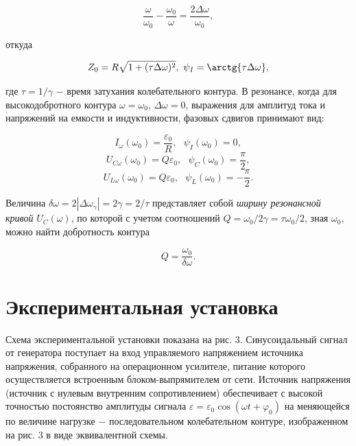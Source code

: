 \documentclass[a4paper,12pt]{article} %
\begin{document}
$$
\frac{\omega}{\omega_{0}} - \frac{\omega_{0}}{\omega} = \frac{2\Delta\omega}{\omega_{0}},
$$

\hfill \break откуда

$$
Z_{0} = R\sqrt{1+(\tau\Delta\omega)^2}, \text{ } \psi_{I} = \arctg{\tau\Delta\omega},
$$

\hfill \break где $\tau = 1/\gamma$ $-$ время затухания колебательного контура. В резонансе, когда для высокодобротного контура $\omega = \omega_{0}$, $\Delta \omega = 0$, выражения для амплитуд тока и напряжений на емкости и индуктивности, фазовых сдвигов принимают вид:

\begin{equation}\label{ linkname }
I_{\omega}(\omega_{0}) = \frac{\varepsilon_{0}}{R}, \text{ } \psi_{I} (\omega_{0}) = 0,
\end{equation}
\begin{equation}\label{ linkname }
U_{C\omega} (\omega_{0}) = Q\varepsilon_{0}, \text{ } \psi_{C} (\omega_{0}) = \frac{\pi}{2},
\end{equation}
\begin{equation}\label{ linkname }
U_{L\omega} (\omega_{0}) = Q\varepsilon_{0}, \text{ } \psi_{L} (\omega_{0})  = -\frac{\pi}{2}.
\end{equation}

\hfill \break Величина $\delta \omega = 2|\Delta \omega_{\gamma}| = 2\gamma = 2/\tau$ представляет собой \textit{ширину резонансной кривой} $U_{C} (\omega)$, по которой с учетом соотношений $Q = \omega_{0}/2\gamma = \tau\omega_{0}/2$, зная $\omega_{0}$, можно найти добротность контура

\begin{equation}\label{ linkname }
Q = \frac{\omega_{0}}{\delta\omega}.
\end{equation}

\section{Экспериментальная установка}

\hfill \break Схема экспериментальной установки показана на рис. 3. Синусоидальный сигнал от генератора поступает на вход управляемого напряжением источника напряжения, собранного на операционном усилителе, питание которого осуществляется встроенным блоком-выпрямителем от сети. Источник напряжения (источник с нулевым внутренним сопротивлением) обеспечивает с высокой точностью постоянство амплитуды сигнала $\varepsilon = \varepsilon_{0}\cos{(\omega t + \varphi_{0})}$ на меняющейся по величине нагрузке $-$ последовательном колебательном контуре, изображенном на рис. 3 в виде эквивалентной схемы. 
\end{document}
